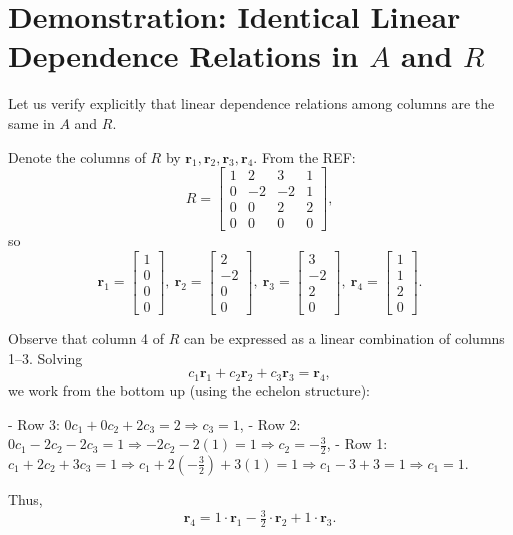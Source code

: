 \documentclass{article}
\begin{document}
\section*{Demonstration: Identical Linear Dependence Relations in $A$ and $R$}

Let us verify explicitly that linear dependence relations among columns are the same in $A$ and $R$.

Denote the columns of $R$ by $\mathbf{r}_1, \mathbf{r}_2, \mathbf{r}_3, \mathbf{r}_4$. From the REF:
\[
R = \begin{bmatrix}
1 & 2 & 3 & 1 \\
0 & -2 & -2 & 1 \\
0 & 0 & 2 & 2 \\
0 & 0 & 0 & 0
\end{bmatrix},
\]
so
\[
\mathbf{r}_1 = \begin{bmatrix}1\\0\\0\\0\end{bmatrix},\ 
\mathbf{r}_2 = \begin{bmatrix}2\\-2\\0\\0\end{bmatrix},\ 
\mathbf{r}_3 = \begin{bmatrix}3\\-2\\2\\0\end{bmatrix},\ 
\mathbf{r}_4 = \begin{bmatrix}1\\1\\2\\0\end{bmatrix}.
\]

Observe that column 4 of $R$ can be expressed as a linear combination of columns 1–3. Solving
\[
c_1 \mathbf{r}_1 + c_2 \mathbf{r}_2 + c_3 \mathbf{r}_3 = \mathbf{r}_4,
\]
we work from the bottom up (using the echelon structure):

- Row 3: $0c_1 + 0c_2 + 2c_3 = 2 \Rightarrow c_3 = 1$,
- Row 2: $0c_1 -2c_2 -2c_3 = 1 \Rightarrow -2c_2 -2(1) = 1 \Rightarrow c_2 = -\tfrac{3}{2}$,
- Row 1: $c_1 + 2c_2 + 3c_3 = 1 \Rightarrow c_1 + 2(-\tfrac{3}{2}) + 3(1) = 1 \Rightarrow c_1 -3 + 3 = 1 \Rightarrow c_1 = 1$.

Thus,
\[
\mathbf{r}_4 = 1\cdot\mathbf{r}_1 - \tfrac{3}{2}\cdot\mathbf{r}_2 + 1\cdot\mathbf{r}_3.
\]
\end{document}
